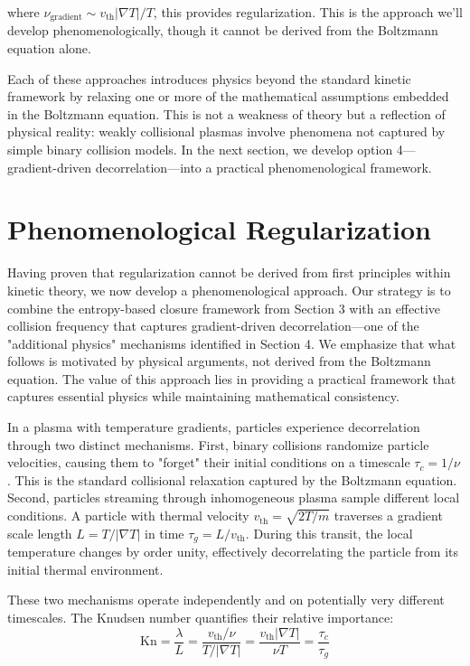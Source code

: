 \documentclass[12pt,a4paper]{article}
\newcommand{\Kn}{\text{Kn}}
\begin{document}
where $\nu_{\text{gradient}} \sim v_{\text{th}}|\nabla T|/T$, this provides regularization. This is the approach we'll develop phenomenologically, though it cannot be derived from the Boltzmann equation alone.

Each of these approaches introduces physics beyond the standard kinetic framework by relaxing one or more of the mathematical assumptions embedded in the Boltzmann equation. This is not a weakness of theory but a reflection of physical reality: weakly collisional plasmas involve phenomena not captured by simple binary collision models. In the next section, we develop option 4—gradient-driven decorrelation—into a practical phenomenological framework.

\section{Phenomenological Regularization}

Having proven that regularization cannot be derived from first principles within kinetic theory, we now develop a phenomenological approach. Our strategy is to combine the entropy-based closure framework from Section 3 with an effective collision frequency that captures gradient-driven decorrelation—one of the "additional physics" mechanisms identified in Section 4. We emphasize that what follows is motivated by physical arguments, not derived from the Boltzmann equation. The value of this approach lies in providing a practical framework that captures essential physics while maintaining mathematical consistency.

In a plasma with temperature gradients, particles experience decorrelation through two distinct mechanisms. First, binary collisions randomize particle velocities, causing them to "forget" their initial conditions on a timescale $\tau_c = 1/\nu$. This is the standard collisional relaxation captured by the Boltzmann equation. Second, particles streaming through inhomogeneous plasma sample different local conditions. A particle with thermal velocity $v_{\text{th}} = \sqrt{2T/m}$ traverses a gradient scale length $L = T/|\nabla T|$ in time $\tau_g = L/v_{\text{th}}$. During this transit, the local temperature changes by order unity, effectively decorrelating the particle from its initial thermal environment.

These two mechanisms operate independently and on potentially very different timescales. The Knudsen number quantifies their relative importance:
\begin{equation}
\Kn = \frac{\lambda}{L} = \frac{v_{\text{th}}/\nu}{T/|\nabla T|} = \frac{v_{\text{th}}|\nabla T|}{\nu T} = \frac{\tau_c}{\tau_g}
\label{eq:kn_decorrelation}
\end{equation}
\end{document}
